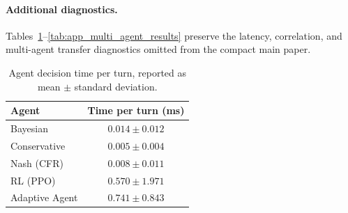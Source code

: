 \paragraph{Additional diagnostics.}
Tables~\ref{tab:app_latency_analysis}--\ref{tab:app_multi_agent_results} preserve the latency, correlation, and multi-agent transfer diagnostics omitted from the compact main paper.

\begin{table}[t]
\centering
\scriptsize
\begin{tabular}{lc}
\toprule
Agent & Time per turn (ms) \\
\midrule
Bayesian & $0.014 \pm 0.012$ \\
Conservative & $0.005 \pm 0.004$ \\
Nash (CFR) & $0.008 \pm 0.011$ \\
RL (PPO) & $0.570 \pm 1.971$ \\
Adaptive Agent & $0.741 \pm 0.843$ \\
\bottomrule
\end{tabular}
\caption{Agent decision time per turn, reported as mean $\pm$ standard deviation.}
\label{tab:app_latency_analysis}
\end{table}

\begin{table}[t]
\centering
\scriptsize
{}
\caption{Pearson correlation matrix between win rate and behavioral statistics.}
\label{tab:app_correlation_matrix}
\end{table}

